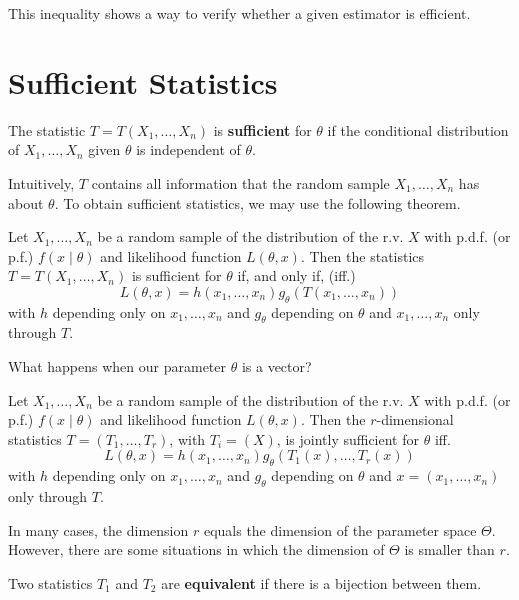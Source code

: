 \documentclass[12pt,a4paper]{report}
\begin{document}
This inequality shows a way to verify whether a given estimator is efficient. 

\section{Sufficient Statistics}

\begin{definition}
    The statistic $T = T(X_1, \ldots, X_n)$ is \textbf{sufficient} for $\theta$ if the conditional distribution of $X_1, \ldots, X_n$ given $\theta$ is independent of $\theta$. 
\end{definition}

Intuitively, $T$ contains all information that the random sample $X_1, \ldots, X_n$ has about $\theta$. To obtain sufficient statistics, we may use the following theorem.

\begin{theorem}
    Let $X_1, \ldots, X_n$ be a random sample of the distribution of the r.v. $X$ with p.d.f. (or p.f.) $f( x \mid \theta)$ and likelihood function $L(\theta, x)$. Then the statistics $T = T(X_1, \ldots, X_n)$ is sufficient for $\theta$ if, and only if, (iff.) 
    \[
        L(\theta, x) = h(x_1, \ldots, x_n) g_\theta(T(x_1, \ldots, x_n))
    \]
    with $h$ depending only on $x_1, \ldots, x_n$ and $g_\theta$ depending on $\theta$ and $x_1, \ldots, x_n$ only through $T$.
\end{theorem}

What happens when our parameter $\theta$ is a vector? 

\begin{theorem}
    Let $X_1, \ldots, X_n$ be a random sample of the distribution of the r.v. $X$ with p.d.f. (or p.f.) $f( x \mid \theta)$ and likelihood function $L(\theta, x)$. Then the $r$-dimensional statistics $T =(T_1, \ldots, T_r)$, with $T_i = (X)$, is jointly sufficient for $\theta$ iff. 
    \[
        L(\theta, x) = h(x_1, \ldots, x_n) g_\theta(T_1(x), \ldots, T_r(x))
    \]
    with $h$ depending only on $x_1, \ldots, x_n$ and $g_\theta$ depending on $\theta$ and $x = (x_1, \ldots, x_n)$ only through $T$.
\end{theorem}

In many cases, the dimension $r$ equals the dimension of the parameter space $\Theta$. However, there are some situations in which the dimension of $\Theta$ is smaller than $r$.

\begin{definition}
    Two statistics $T_1$ and $T_2$ are \textbf{equivalent} if there is a bijection between them.
\end{definition}
\end{document}
